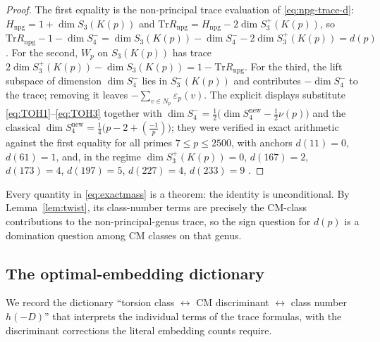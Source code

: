 \documentclass[11pt]{amsart}
\theoremstyle{plain}
\theoremstyle{definition}
\newcommand{\Tr}{\mathrm{Tr}}
\newcommand{\snew}{S^{\mathrm{new}}}
\newcommand{\eps}{\varepsilon}
\providecommand{\kro}[2]{\left(\frac{#1}{#2}\right)}
\providecommand{\snew}{S^{\mathrm{new}}}
\begin{document}
	\begin{proof}
		The first equality is the non-principal trace evaluation of
		\eqref{eq:npg-trace-d}: $H_{\mathrm{npg}}=1+\dim S_3(K(p))$ and
		$\Tr R_{\mathrm{npg}}=H_{\mathrm{npg}}-2\dim S_3^+(K(p))$, so
		$\Tr R_{\mathrm{npg}}-1-\dim S_4^-
		=\dim S_3(K(p))-\dim S_4^--2\dim S_3^+(K(p))=d(p)$. For the second,
		$W_p$ on $S_3(K(p))$ has trace
		$2\dim S_3^+(K(p))-\dim S_3(K(p))=1-\Tr R_{\mathrm{npg}}$. For the third,
		the lift subspace of dimension $\dim S_4^-$ lies in $S_3^-(K(p))$
		\cite{IPY2013} and contributes $-\dim S_4^-$ to the trace; removing it
		leaves $-\sum_{v\in N_p}\eps_p(v)$. The explicit displays substitute
		\eqref{eq:TOH1}--\eqref{eq:TOH3}
		together with $\dim S_4^-=\tfrac12\bigl(\dim\snew_4-\tfrac12\nu(p)\bigr)$
		and the classical $\dim\snew_4=\tfrac14\bigl(p-2+\kro{-1}{p}\bigr)$; they were verified
		in exact arithmetic against the first equality for all primes
		$7\le p\le2500$, with anchors $d(11)=0$, $d(61)=1$, and, in the regime
		$\dim S_3^+(K(p))=0$, $d(167)=2$, $d(173)=4$, $d(197)=5$, $d(227)=4$,
		$d(233)=9$ \cite{artifact}.
	\end{proof}
	
	Every quantity in \eqref{eq:exactmass} is a theorem: the identity is
	unconditional. By Lemma~\ref{lem:twist}, its class-number terms are
	precisely the CM-class contributions to the non-principal-genus trace, so
	the sign question for $d(p)$ is a domination question among CM classes on
	that genus.
	
	\subsection{The optimal-embedding dictionary}
	\label{ss:twist}
	
	We record the dictionary ``torsion class $\leftrightarrow$ CM discriminant
	$\leftrightarrow$ class number $h(-D)$'' that interprets the individual
	terms of the trace formulas, with the discriminant corrections the literal
	embedding counts require.
	
\end{document}

